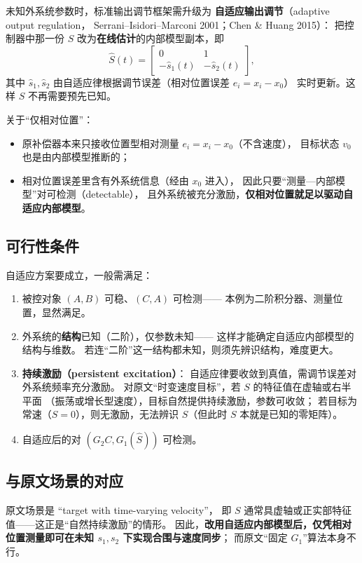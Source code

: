 未知外系统参数时，标准输出调节框架需升级为
\textbf{自适应输出调节}（adaptive output regulation，
Serrani--Isidori--Marconi 2001；Chen \& Huang 2015）：
把控制器中那一份 $S$ 改为\textbf{在线估计}的内部模型副本，即
\[
\hat S(t)=\begin{bmatrix}0&1\\ -\hat s_1(t)&-\hat s_2(t)\end{bmatrix},
\]
其中 $\hat s_1,\hat s_2$ 由自适应律根据调节误差（相对位置误差 $e_i=x_i-x_0$）
实时更新。这样 $S$ 不再需要预先已知。

关于“仅相对位置”：
\begin{itemize}
  \item 原补偿器本来只接收位置型相对测量 $e_i=x_i-x_0$（不含速度），
    目标状态 $v_0$ 也是由内部模型推断的；
  \item 相对位置误差里含有外系统信息（经由 $x_0$ 进入），
    因此只要“测量—内部模型”对可检测（detectable），
    且外系统被充分激励，\textbf{仅相对位置就足以驱动自适应内部模型}。
\end{itemize}

\subsection{可行性条件}

自适应方案要成立，一般需满足：
\begin{enumerate}
  \item 被控对象 $(A,B)$ 可稳、$(C,A)$ 可检测——
    本例为二阶积分器、测量位置，显然满足。
  \item 外系统的\textbf{结构}已知（二阶），仅参数未知——
    这样才能确定自适应内部模型的结构与维数。
    若连“二阶”这一结构都未知，则须先辨识结构，难度更大。
  \item \textbf{持续激励（persistent excitation）}：
    自适应律要收敛到真值，需调节误差对外系统频率充分激励。
    对原文“时变速度目标”，若 $S$ 的特征值在虚轴或右半平面
    （振荡或增长型速度），目标自然提供持续激励，参数可收敛；
    若目标为常速（$S=0$），则无激励，无法辨识 $S$（但此时 $S$ 本就是已知的零矩阵）。
  \item 自适应后的对 $(G_2C, G_1(\hat S))$ 可检测。
\end{enumerate}

\subsection{与原文场景的对应}

原文场景是 “target with time-varying velocity”，
即 $S$ 通常具虚轴或正实部特征值——这正是“自然持续激励”的情形。
因此，\textbf{改用自适应内部模型后，仅凭相对位置测量即可在未知 $s_1,s_2$ 下实现合围与速度同步}；
而原文“固定 $G_1$”算法本身不行。

